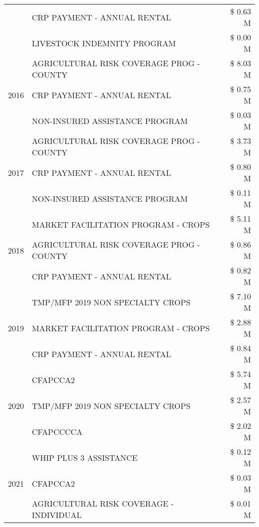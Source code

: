 \begin{tabular}{llr}
 & CRP PAYMENT - ANNUAL RENTAL & \$ 0.63 M \\
 & LIVESTOCK INDEMNITY PROGRAM & \$ 0.00 M \\
\cline{1-3}
\multirow[t]{3}{*}{2016} & AGRICULTURAL RISK COVERAGE PROG - COUNTY      & \$ 8.03 M \\
 & CRP PAYMENT - ANNUAL RENTAL                   & \$ 0.75 M \\
 & NON-INSURED ASSISTANCE PROGRAM                & \$ 0.03 M \\
\cline{1-3}
\multirow[t]{3}{*}{2017} & AGRICULTURAL RISK COVERAGE PROG - COUNTY & \$ 3.73 M \\
 & CRP PAYMENT - ANNUAL RENTAL & \$ 0.80 M \\
 & NON-INSURED ASSISTANCE PROGRAM & \$ 0.11 M \\
\cline{1-3}
\multirow[t]{3}{*}{2018} & MARKET FACILITATION PROGRAM - CROPS & \$ 5.11 M \\
 & AGRICULTURAL RISK COVERAGE PROG - COUNTY & \$ 0.86 M \\
 & CRP PAYMENT - ANNUAL RENTAL & \$ 0.82 M \\
\cline{1-3}
\multirow[t]{3}{*}{2019} & TMP/MFP 2019 NON SPECIALTY CROPS & \$ 7.10 M \\
 & MARKET FACILITATION PROGRAM - CROPS & \$ 2.88 M \\
 & CRP PAYMENT - ANNUAL RENTAL & \$ 0.84 M \\
\cline{1-3}
\multirow[t]{3}{*}{2020} & CFAPCCA2 & \$ 5.74 M \\
 & TMP/MFP 2019 NON SPECIALTY CROPS & \$ 2.57 M \\
 & CFAPCCCCA & \$ 2.02 M \\
\cline{1-3}
\multirow[t]{3}{*}{2021} & WHIP PLUS 3 ASSISTANCE & \$ 0.12 M \\
 & CFAPCCA2 & \$ 0.03 M \\
 & AGRICULTURAL RISK COVERAGE - INDIVIDUAL & \$ 0.01 M \\
\cline{1-3}
\bottomrule
\end{tabular}
